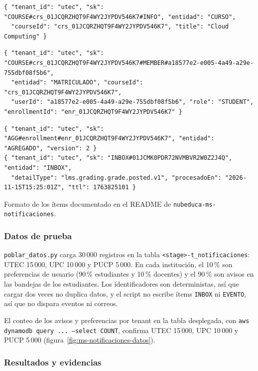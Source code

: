 \begin{lstlisting}
{ "tenant_id": "utec", "sk": "COURSE#crs_01JCQRZHQT9F4WY2JYPDV546K7#INFO", "entidad": "CURSO",
  "courseId": "crs_01JCQRZHQT9F4WY2JYPDV546K7", "title": "Cloud Computing" }
\end{lstlisting}

\begin{lstlisting}
{ "tenant_id": "utec", "sk": "COURSE#crs_01JCQRZHQT9F4WY2JYPDV546K7#MEMBER#a18577e2-e005-4a49-a29e-755dbf08f5b6",
  "entidad": "MATRICULADO", "courseId": "crs_01JCQRZHQT9F4WY2JYPDV546K7",
  "userId": "a18577e2-e005-4a49-a29e-755dbf08f5b6", "role": "STUDENT", "enrollmentId": "enr_01JCQRZHQT9F4WY2JYPDV546K7" }
\end{lstlisting}

\begin{lstlisting}
{ "tenant_id": "utec", "sk": "AGG#enrollment#enr_01JCQRZHQT9F4WY2JYPDV546K7", "entidad": "AGREGADO", "version": 2 }
{ "tenant_id": "utec", "sk": "INBOX#01JCMK0PDR72NVMBVR2W0Z2J4Q", "entidad": "INBOX",
  "detailType": "lms.grading.grade.posted.v1", "procesadoEn": "2026-11-15T15:25:01Z", "ttl": 1763825101 }
\end{lstlisting}

Formato de los ítems documentado en el README de \texttt{nubeduca-ms-notificaciones}.

\subsubsection{Datos de prueba}
\texttt{poblar\_datos.py} carga 30\,000 registros en la tabla \texttt{<stage>-t\_notificaciones}: UTEC
15\,000, UPC 10\,000 y PUCP 5\,000. En cada institución, el 10\,\% son preferencias de usuario (90\,\%
estudiantes y 10\,\% docentes) y el 90\,\% son avisos en las bandejas de los estudiantes. Los
identificadores son deterministas, así que cargar dos veces no duplica datos, y el script no escribe
ítems \texttt{INBOX} ni \texttt{EVENTO}, así que no dispara eventos ni correos.

El conteo de los avisos y preferencias por tenant en la tabla desplegada, con
\texttt{aws dynamodb query ... --select COUNT}, confirma UTEC 15\,000, UPC 10\,000 y PUCP 5\,000
(figura~\ref{fig:ms-notificaciones-datos}).


\subsubsection{Resultados y evidencias}
